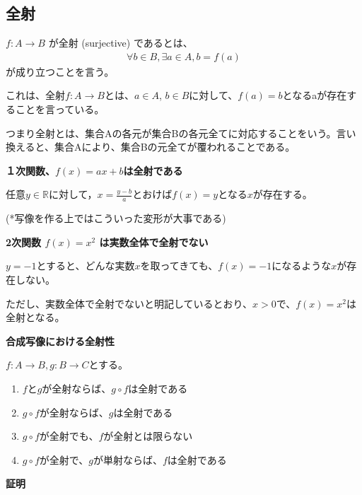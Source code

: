 \documentclass[dvipdfmx,autodetect-engine]{jsarticle}
\begin{document}
\subsection{全射}

$f: A \to B$ が全射 (surjective) であるとは、
\begin{eqnarray*}
\forall b \in B, \exists a \in A, b = f(a)
\end{eqnarray*}
が成り立つことを言う。

これは、全射$f: A \to B$とは、$a \in A$, $b \in B$に対して、$f(a) = b$となるaが存在することを言っている。

つまり全射とは、集合Aの各元が集合Bの各元全てに対応することをいう。言い換えると、集合Aにより、集合Bの元全てが覆われることである。

\exam

{\bf １次関数、$f(x) = ax+b$は全射である}

任意$y \in \mathbb{R}$に対して，$x = \frac{y-b}{a}$とおけば$f(x) = y$となる$x$が存在する。

(*写像を作る上ではこういった変形が大事である)


\exam
{\bf 2次関数 $f(x)=x^2$ は実数全体で全射でない}

$y=-1$とすると、どんな実数$x$を取ってきても、$f(x) = -1$になるような$x$が存在しない。

ただし、実数全体で全射でないと明記しているとおり、$x > 0$で、$f(x)=x^2$は全射となる。

\prop

 {\bf 合成写像における全射性 }
 
 $f:A \to B, g: B \to C$とする。

\begin{enumerate}
\renewcommand{\labelenumi}{(\arabic{enumi})}
	\item $f$と$g$が全射ならば、$g \circ f$は全射である
	\item $g \circ f$が全射ならば、$g$は全射である
	\item $g \circ f$が全射でも、$f$が全射とは限らない
	\item $g \circ f$が全射で、$g$が単射ならば、$f$は全射である
\end{enumerate}

{ \bf 証明}
\end{document}
